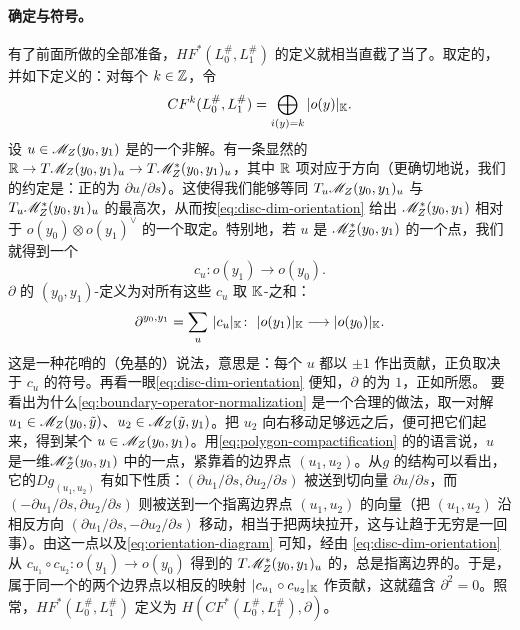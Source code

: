 \paragraph{确定\trGrading{}与符号。}\label{sub:determining-grading-and-signs}
有了前面所做的全部准备，$HF^*(L_0^{\#},L_1^{\#})$ 的定义就相当直截了当了。取定\trRegular{}的\trFloerDatum，并如下定义\trGraded{}的\trFloerCochainGroup：对每个 $k\in\mathbb{Z}$，令
\begin{equation}\label{eq:graded-floer-cochains}
CF^k(L_0^{\#},L_1^{\#})=\bigoplus_{i(y)=k}|o(y)|_{\mathbb{K}}.
\end{equation}
设 $u\in\mathscr{M}_Z(y_0,y_1)$ 是\trFloerEquation{}的一个非\trStationary{}解。有一条显然的\trShortExactSequence{}$\mathbb{R}\to T\mathscr{M}_Z(y_0,y_1)_u\to T\mathscr{M}^*_Z(y_0,y_1)_u$，其中 $\mathbb{R}$ 项对应于\trTranslation{}方向（更确切地说，我们的约定是：正的\trGenerator{}为 $\partial u/\partial s$）。这使得我们能够等同 $T_u\mathscr{M}_Z(y_0,y_1)_u$ 与 $T_u\mathscr{M}^*_Z(y_0,y_1)_u$ 的最高次\trExteriorPower，从而按\eqref{eq:disc-dim-orientation} 给出 $\mathscr{M}^*_Z(y_0,y_1)$ 相对于 $o(y_0)\otimes o(y_1)^{\vee}$ 的一个取定\trOrientation。特别地，若 $u$ 是 $\mathscr{M}^*_Z(y_0,y_1)$ 的一个\trIsolated{}点，我们就得到一个\trIsomorphism
\begin{equation}\label{eq:relative-orientation-cu}
c_u\colon o(y_1)\longrightarrow o(y_0).
\end{equation}
\trBoundaryOperator{}$\partial$ 的 $(y_0,y_1)$-\trCoefficients{}定义为对所有这些 $c_u$ 取 $\mathbb{K}$-\trNormalization{}之和：
\begin{equation}\label{eq:boundary-operator-normalization}
\partial^{y_0,y_1}=\sum_u\,|c_u|_\KK\colon\ |o(y_1)|_\KK\longrightarrow|o(y_0)|_\KK.
\end{equation}
这是一种花哨的（免基的）说法，意思是：每个 $u$ 都以 $\pm1$ 作出贡献，正负取决于 $c_u$ 的符号。再看一眼\eqref{eq:disc-dim-orientation} 便知，$\partial$ 的\trDegree{}为 $1$，正如所愿。
要看出为什么\eqref{eq:boundary-operator-normalization} 是一个合理的做法，取一对解 $u_1\in\mathscr{M}_Z(y_0,\tilde{y})$、$u_2\in\mathscr{M}_Z(\tilde{y},y_1)$。把 $u_2$ 向右移动足够远之后，便可把它们\trGluing{}起来，得到某个 $u\in\mathscr{M}_Z(y_0,y_1)$。用\eqref{eq:polygon-compactification} 的\trGromov{}\trCompactification{}的语言说，$u$ 是一维\trModuliSpace{}$\mathscr{M}^*_Z(y_0,y_1)$ 中的一点，紧靠着\trCompactification{}的边界点 $(u_1,u_2)$。从\trGluingMap{}$g$ 的结构可以看出，它的\trDifferential{}$Dg_{(u_1,u_2)}$ 有如下性质：$(\partial u_1/\partial s,\partial u_2/\partial s)$ 被送到\trTranslation{}切向量 $\partial u/\partial s$，而 $(-\partial u_1/\partial s,\partial u_2/\partial s)$ 则被送到一个指离边界点 $(u_1,u_2)$ 的向量（把 $(u_1,u_2)$ 沿相反方向 $(\partial u_1/\partial s,-\partial u_2/\partial s)$ 移动，相当于把两块拉开，这与让\trGluingLength{}趋于无穷是一回事）。由这一点以及\eqref{eq:orientation-diagram} 可知，经由\trIsomorphism{} \eqref{eq:disc-dim-orientation} 从 $c_{u_1}\circ c_{u_2}\colon o(y_1)\to o(y_0)$ 得到的 $T\mathscr{M}^*_Z(y_0,y_1)_u$ 的\trOrientation，总是指离\trGromov{}边界的。于是，属于同一个\trConnectedComponent{}的两个边界点以相反的映射 $|c_{u_1}\circ c_{u_2}|_{\mathbb{K}}$ 作贡献，这就蕴含 $\partial^2=0$。照常，$HF^*(L_0^{\#},L_1^{\#})$ 定义为 $H(CF^*(L_0^{\#},L_1^{\#}),\partial)$。
